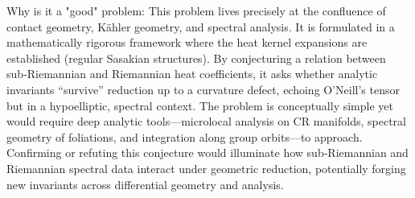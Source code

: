 Why is it a "good" problem:  
This problem lives precisely at the confluence of contact geometry, Kähler geometry, and spectral analysis. It is formulated in a mathematically rigorous framework where the heat kernel expansions are established (regular Sasakian structures). By conjecturing a relation between sub‑Riemannian and Riemannian heat coefficients, it asks whether analytic invariants “survive” reduction up to a curvature defect, echoing O’Neill’s tensor but in a hypoelliptic, spectral context. The problem is conceptually simple yet would require deep analytic tools—microlocal analysis on CR manifolds, spectral geometry of foliations, and integration along group orbits—to approach. Confirming or refuting this conjecture would illuminate how sub‑Riemannian and Riemannian spectral data interact under geometric reduction, potentially forging new invariants across differential geometry and analysis.